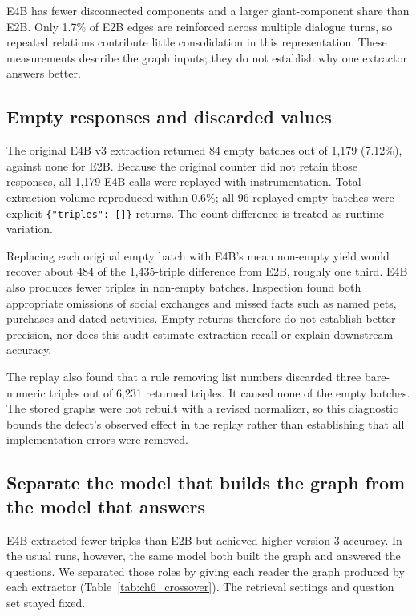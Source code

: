 E4B has fewer disconnected components and a larger giant-component share than E2B.
Only 1.7\% of E2B edges are reinforced across multiple dialogue turns, so repeated
relations contribute little consolidation in this representation. These measurements
describe the graph inputs; they do not establish why one extractor answers better.

\subsection{Empty responses and discarded values}
\label{sec:ch6_extraction_replay}

The original E4B v3 extraction returned 84 empty batches out of 1,179 (7.12\%), against
none for E2B. Because the original counter did not retain those responses, all 1,179 E4B
calls were replayed with instrumentation. Total extraction volume reproduced within 0.6\%;
all 96 replayed empty batches were explicit \texttt{\{"triples": []\}} returns.
The count difference is treated as runtime variation.

Replacing each original empty batch with E4B's mean non-empty yield would recover about
484 of the 1,435-triple difference from E2B, roughly one third. E4B also produces fewer
triples in non-empty batches. Inspection found both appropriate omissions of social
exchanges and missed facts such as named pets, purchases and dated activities. Empty
returns therefore do not establish better precision, nor does this audit estimate
extraction recall or explain downstream accuracy.

The replay also found that a rule removing list numbers discarded three bare-numeric
triples out of 6,231 returned triples. It caused none of the empty batches. The stored
graphs were not rebuilt with a revised normalizer, so this diagnostic bounds the defect's
observed effect in the replay rather than establishing that all implementation errors
were removed.

\subsection{Separate the model that builds the graph from the model that answers}

E4B extracted fewer triples than E2B but achieved higher version 3 accuracy. In the usual
runs, however, the same model both built the graph and answered the questions. We separated
those roles by giving each reader the graph produced by each extractor
(Table~\ref{tab:ch6_crossover}). The retrieval settings and question set stayed fixed.

